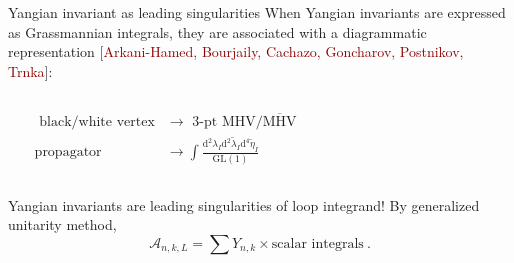\documentclass[10pt]{beamer}
\newcommand{\dif}{\mathrm{d}}
\renewcommand{\tilde}{\widetilde}
\begin{document}
\begin{frame}{Yangian invariant as leading singularities}
When Yangian invariants are expressed as Grassmannian integrals, they are associated with a diagrammatic representation {\footnotesize[\textcolor{darkred}{Arkani-Hamed, Bourjaily, Cachazo, Goncharov, Postnikov, Trnka}]}:
\begin{columns}
  \hfill \begin{center}
  \end{center}
  \begin{align*}
   \text{ black/white vertex} &\to \text{ 3-pt MHV/$\overline{\text{MHV}}$} \\
    \text{propagator } &\to   \int \frac{\dif^{2}\lambda_{I}\dif^{2}\tilde{\lambda}_{I} \dif^{4}\tilde{\eta}_{I}}{\mathrm{GL}(1)} 
  \end{align*}
\end{columns}
Yangian invariants are leading singularities of loop integrand! By generalized unitarity method,
\begin{equation*}
  \mathcal{A}_{n,k,L}= \sum Y_{n,k} \times \text{scalar integrals} \:.
\end{equation*}
  
\end{frame}
\end{document}
